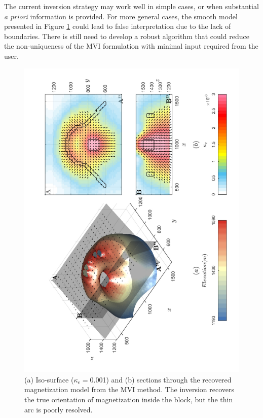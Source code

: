 The current inversion strategy may work well in simple cases, or when substantial \emph{a priori} information is provided.
For more general cases, the smooth model presented in Figure \ref{fig:3D_Inv_l2l2_model_TMVI} could lead to false interpretation due to the lack of boundaries.
There is still need to develop a robust algorithm that could reduce the non-uniqueness of the MVI formulation with minimal input required from the user.

\newpage
\begin{figure}[h!]
\centering
\includegraphics[scale=0.52, angle =270]{3D_Inv_l2l2_model_TMVI.pdf}
\caption{ (a) Iso-surface ($\kappa_e=$0.001) and (b) sections through the recovered magnetization model from the MVI method. The inversion recovers the true orientation of magnetization inside the block, but the thin arc is poorly resolved. }
\label{fig:3D_Inv_l2l2_model_TMVI}
\end{figure}
